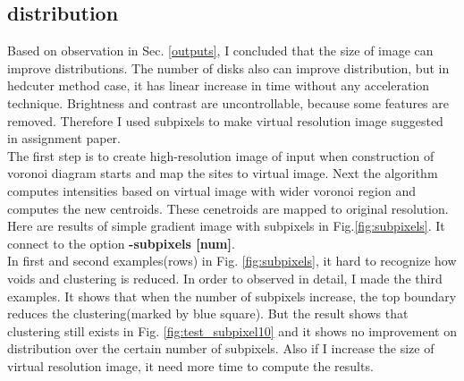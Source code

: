 \documentclass[11pt]{article}
\begin{document}
\subsection{distribution}
Based on observation in Sec. \ref{outputs}, I concluded that the size of image can improve distributions. The number of disks also can improve distribution, but in hedcuter method case, it has linear increase in time without any acceleration technique. Brightness and contrast are uncontrollable, because some features are removed. Therefore I used subpixels to make virtual resolution image suggested in assignment paper.\\
The first step is to create high-resolution image of input when construction of voronoi diagram starts and map the sites to virtual image. Next the algorithm computes intensities based on virtual image with wider voronoi region and computes the new centroids. These cenetroids are mapped to original resolution. Here are results of simple gradient image with subpixels in Fig.\ref{fig:subpixels}. It connect to the option \textbf{-subpixels [num]}.\\
In first and second examples(rows) in Fig. \ref{fig:subpixels}, it hard to recognize how voids and clustering is reduced. In order to observed in detail, I made the third examples. It shows that when the number of subpixels increase, the top boundary reduces the clustering(marked by blue square). But the result shows that clustering still exists in Fig. \ref{fig:test_subpixel10} and it shows no improvement on distribution over the certain number of subpixels. Also if I increase the size of virtual resolution image, it need more time to compute the results. 
\end{document}
